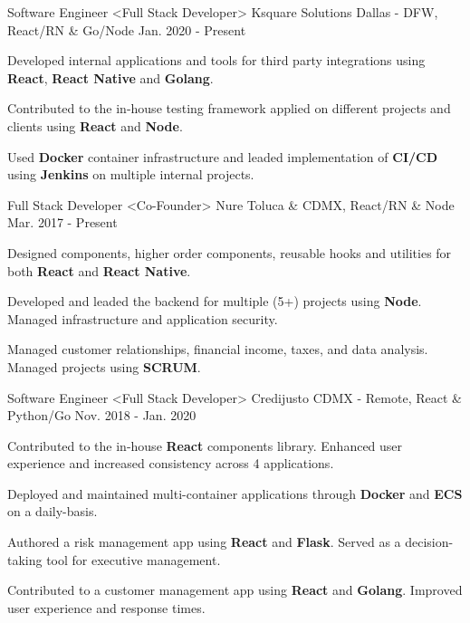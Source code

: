 \begin{cventries}
  \cventry
    {Software Engineer <Full Stack Developer>}
    {Ksquare Solutions}
    {Dallas - DFW, React/RN \& Go/Node}
    {Jan. 2020 - Present}
    {
      \begin{cvitems}
        \item {Developed internal applications and tools for third party integrations using \textbf{React}, \textbf{React Native} and \textbf{Golang}.}
        \item {Contributed to the in-house testing framework applied on different projects and clients using \textbf{React} and \textbf{Node}.}
        \item {Used \textbf{Docker} container infrastructure and leaded implementation of \textbf{CI/CD} using \textbf{Jenkins} on multiple internal projects.}
      \end{cvitems}
    }
  \cventry
    {Full Stack Developer <Co-Founder>}
    {Nure}
    {Toluca \& CDMX, React/RN \& Node}
    {Mar. 2017 - Present}
    {
      \begin{cvitems}
        \item {Designed components, higher order components, reusable hooks and utilities for both \textbf{React} and \textbf{React Native}.}
        \item {Developed and leaded the backend for multiple (5+) projects using \textbf{Node}. Managed infrastructure and application security.}
         \item {Managed customer relationships, financial income, taxes, and data analysis. Managed projects using \textbf{SCRUM}.}
      \end{cvitems}
    }
  \cventry
    {Software Engineer <Full Stack Developer>}
    {Credijusto}
    {CDMX - Remote, React \& Python/Go}
    {Nov. 2018 - Jan. 2020}
    {
      \begin{cvitems}
        \item {Contributed to the in-house \textbf{React} components library. Enhanced user experience and increased consistency across 4 applications.}
        \item {Deployed and maintained multi-container applications through \textbf{Docker} and \textbf{ECS} on a daily-basis.}
        \item {Authored a risk management app using \textbf{React} and \textbf{Flask}. Served as a decision-taking tool for executive management.}
        \item {Contributed to a customer management app using \textbf{React} and \textbf{Golang}. Improved user experience and response times.}

\end{cvitems}}
\end{cventries}
